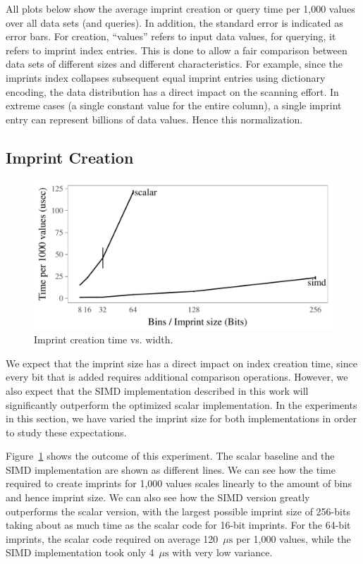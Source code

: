 \documentclass[sigconf]{acmart}
\begin{document}
All plots below show the average imprint creation or query time per 1,000 values over all data sets (and queries).  In addition, the standard error
is indicated as error bars.  For creation, ``values'' refers to input data values, for querying, it refers to imprint index entries. This is done
to allow a fair comparison between data sets of different sizes and different characteristics. For example, since the imprints index collapses
subsequent equal imprint entries using dictionary encoding, the data distribution has a direct impact on the scanning effort. In extreme cases
(a single constant value for the entire column), a single imprint entry can represent billions of data values. Hence this normalization.

\subsection{Imprint Creation}

\begin{figure}[t]
\begin{center}
\includegraphics[width=\columnwidth,trim=0mm 0mm 0mm 0mm,clip]{scalebins1.pdf}
\end{center}
\caption{Imprint creation time vs. width.\label{fig:scalebins1}}
\end{figure}

We expect that the imprint size has a direct impact on index creation time, since every bit that is added requires additional comparison
operations. However, we also expect that the SIMD implementation described in this work will significantly outperform the optimized scalar
implementation. In the experiments in this section, we have varied the imprint size for both implementations in order to study these
expectations. 

Figure~\ref{fig:scalebins1} shows the outcome of this experiment. The scalar baseline and the SIMD implementation are shown as different lines. We can see how the time required to create imprints for 1,000 values scales linearly to the amount of bins and hence imprint size. We can also see
how the SIMD version greatly outperforms the scalar version, with the largest possible imprint size of 256-bits taking about as much time as the
scalar code for 16-bit imprints. For the 64-bit imprints, the scalar code required on average 120~\(\mu\text{s}\) per 1,000 values, while the SIMD implementation took only 4~\(\mu\text{s}\) with very low variance.
\end{document}

